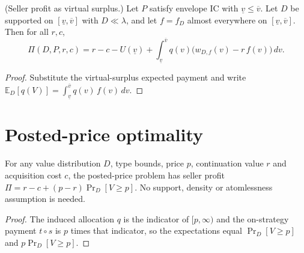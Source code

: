 \begin{theorem}\label{thm:MathEconLib.ValueDistribution.sellerProfit_eq_virtualSurplus}\leanok
{}
(Seller profit as virtual surplus.) Let $P$ satisfy envelope IC with $\underline v\le\overline v$. Let $D$ be supported on $[\underline v,\overline v]$ with $D\ll\lambda$, and let $f=f_D$ almost everywhere on $[\underline v,\overline v]$. Then for all $r,c$,
\[
\Pi(D,P,r,c)=r-c-U(\underline v)+\int_{\underline v}^{\overline v}q(v)\bigl(w_{D,f}(v)-r\,f(v)\bigr)\,dv .
\]
\end{theorem}
\begin{proof}\leanok
{}
Substitute the virtual-surplus expected payment and write $\mathbb{E}_D[q(V)]=\int_{\underline v}^{\overline v}q(v)\,f(v)\,dv$.
\end{proof}

\section{Posted-price optimality}

\begin{proposition}\label{thm:MathEconLib.ValueDistribution.sellerProfit_postedPriceProblem}\leanok
{}
For any value distribution $D$, type bounds, price $p$, continuation value $r$ and acquisition cost $c$, the posted-price problem has seller profit $\Pi=r-c+(p-r)\Pr_D[V\ge p]$. No support, density or atomlessness assumption is needed.
\end{proposition}
\begin{proof}\leanok
The induced allocation $q$ is the indicator of $[p,\infty)$ and the on-strategy payment $t\circ s$ is $p$ times that indicator, so the expectations equal $\Pr_D[V\ge p]$ and $p\Pr_D[V\ge p]$.
\end{proof}

